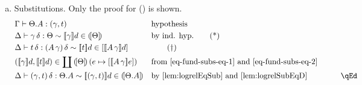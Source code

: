 \documentclass{LMCS}
\theoremstyle{plain}\newtheorem{satz}[thm]{Satz}
\newcommand{\proofLine}[2]{&#1&&\text{#2}}
\newcommand{\ctxe}[2]{#1.#2}
\newcommand{\idsubs}[1]{\mathsf{id}_{#1}}
\newcommand{\exsubs}[2]{( #1, #2)}
\newcommand{\subsc}[2]{#1\,#2}
\newcommand{\subsTm}[2]{#1\,#2}
\newcommand{\subsTy}[2]{#1\,#2}
\newcommand{\depair}[2]{(#1,#2)}
\newcommand{\subid}[2]{\exsubs{\idsubs{#1}}{#2}}
\newcommand{\dterm}[3]{#1\vdash#3:#2}
\newcommand{\dsubs}[3]{#1\vdash#3:#2}
\newcommand{\upa}[2]{\mathop{\uparrow}\nolimits_{#1}{#2}}
\newcommand{\da}[2]{\mathop{\downarrow}\nolimits_{#1}{#2}}
\newcommand{\reify}[2]{\mathsf{R}_{#1}\,#2}
\newcommand{\reifyC}[2]{\mathsf{R}_{|#1|}\,#2}
\newcommand{\sigD}[2]{\coprod\,#1\,#2}
\newcommand{\semc}[1]{[\![#1]\!]}
\newcommand{\rel}{\sim}
\newcommand{\iPair}[2]{(#1 , #2)}
\newcommand{\iVar}[1]{\mathsf{Var}\,x_{#1}}
\newcommand{\ruleref}[1]{(\RefTirName{#1})}
\newcommand{\elimraw}{\mathsf{case}}
\newcommand{\elim}[4]{\elimraw\!^{#1}\;#2\;#3\;#4}
\newcommand{\elimn}[3]{\elimraw\;#1\;#2\;#3}
\newcommand{\constn}[1]{\mathsf{c}_{#1}}
\begin{document}
{\begin{enumerate}[(a)]
\begin{enumerate}[(1)]
\begin{align*}
{           {\subsTm{t_i}{\delta}}{\reifyC{\Delta}{\semc{t_i}d}}}{by \ref{lem:judgeq}}\\
        \proofLine{\quad t'_i:=\reifyC{\Delta}{ \semc{t_i}d}}{abbreviation}\\
        \proofLine{\quad t':= \reifyC{\Delta}{\da{\semc{B}\depair{d}{\constn{i}}}{\semc{t}d}}}{abbreviation}\\
        \proofLine{\quad B' := \reify{|\Delta|+1}{\semc{B}\depair{d}{\iVar{|\Delta|}}}}{abbreviation}\\
        \proofLine{\quad\Delta\vdash
           \subsTm{(\elimn{B}{t_0\cdots t_{n-1}}{t})}{\delta}=}{}\\
         \proofLine{\quad\qquad\elimn{B'}{t'_0\cdots t'_{n-1}}{t'}:\subsTy{B}{\exsubs{\delta}{t}}}{congruence}\\
    \end{align*}\begin{align*}
         \proofLine{\quad
           \dterm{\Delta}{\subsTy{B}{\exsubs{\delta}{t}}}{\subsTm{(\elimn{B}{t_0\cdots t_{n-1}}{t})}{\delta}}
          \rel}{}\\
        \proofLine{\qquad
          \upa{\semc{B}\depair{d}{\semc{t}d}}{
        (\elimn{B'}{t'_0\cdots t'_{n-1}}{t'}\in \semc{B}\depair{d}{\semc{t}d}})}{by \ref{lem:judgeq} and \ref{lem:logrelMon}\qquad\qquad\qquad}\\
        \proofLine{\quad \dterm{\Delta}{\subsTy{B}{\subid{}{t}}}
          {\subsTm{(\elimn{B}{t_0\cdots t_{n-1}}{\constn{i}})}{\delta}}\rel}{}\\
        \proofLine{\qquad\semc{\elim{B}{t_0\cdots t_{n-1}}{t}}d\in [\semc{\subsTy{B}{\subid{}{t}}}d]}
        {by \ref{lem:logrelEqTy} and \ref{lem:logrelEqD}}
    \end{align*}

\end{enumerate}    
  \item Substitutions. Only the proof for \ruleref{ext-subs} is shown.
\begin{align*}
        \proofLine{\dsubs{\Gamma}{\exsubs{\gamma}{t}}{\ctxe{\Theta}{A}}}{hypothesis}\\
        \proofLine{\dsubs{\Delta}{\Theta}{\subsc{\gamma}{\delta}}\rel
          \semc{\gamma}{d}\in \semctx{\Theta}}{by ind. hyp.} \tag{*}\label{eq-fund-subs-eq-1}\\
        \proofLine{\dterm{\Delta}{\subsTy{(\subsTy{A}{\gamma})}{\delta}}{\subsTm{t}{\delta}
          }\rel \semc{t}{d} \in [\semc{\subsTy{A}{\gamma}}{d}]}{} \tag{\textdagger}\label{eq-fund-subs-eq-2}\\
        \proofLine{\iPair{\semc{\gamma}{d}}{\semc{t}{d}} \in
          \sigD{\semctx{\Theta}}{(e \mapsto [\semc{\subsTy{A}{\gamma}
            }{e}])}}{from \eqref{eq-fund-subs-eq-1} and \eqref{eq-fund-subs-eq-2}} \\
        \proofLine{      \dsubs{\Delta}{\ctxe{\Theta}{A}}{\subsc{\exsubs{\gamma}{t}}{\delta}}\rel
          \semc{\exsubs{\gamma}{t}}{d} \in \semctx{\ctxe{\Theta}{A}}}{by \ref{lem:logrelEqSub} and \ref{lem:logrelSubEqD} }\rlap{\hbox to 60pt{\hfill\qEd}} 
      \end{align*}
\end{enumerate}
}
\end{document}
